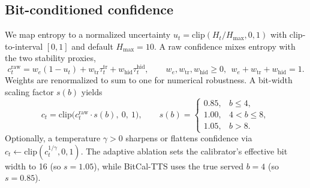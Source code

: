 \documentclass[11pt]{article}
\begin{document}
\subsection{Bit-conditioned confidence}
\label{sec:calibrator}
We map entropy to a normalized uncertainty $u_t = \mathrm{clip}(H_t / H_{\max}, 0, 1)$ with clip-to-interval $[0,1]$ and default $H_{\max}{=}10$. A raw confidence mixes entropy with the two stability proxies,
\begin{equation}
  c^{\mathrm{raw}}_t = w_e(1-u_t) + w_{\mathrm{tr}}\tau^{\mathrm{tr}}_t + w_{\mathrm{hid}}\tau^{\mathrm{hid}}_t,
  \qquad w_e,w_{\mathrm{tr}},w_{\mathrm{hid}} \ge 0,\ \ w_e+w_{\mathrm{tr}}+w_{\mathrm{hid}}=1.
\end{equation}
Weights are renormalized to sum to one for numerical robustness. A bit-width scaling factor $s(b)$ yields
\begin{equation}
  c_t = \mathrm{clip}\bigl(c^{\mathrm{raw}}_t \cdot s(b),\ 0,\ 1\bigr),
  \qquad
  s(b)=
  \begin{cases}
    0.85, & b\le 4,\\
    1.00, & 4<b\le 8,\\
    1.05, & b>8.
  \end{cases}
\end{equation}
Optionally, a temperature $\gamma{>}0$ sharpens or flattens confidence via $c_t \leftarrow \mathrm{clip}(c_t^{1/\gamma},0,1)$. The adaptive ablation sets the calibrator's effective bit width to 16 (so $s{=}1.05$), while BitCal-TTS uses the true served $b{=}4$ (so $s{=}0.85$).
\end{document}
